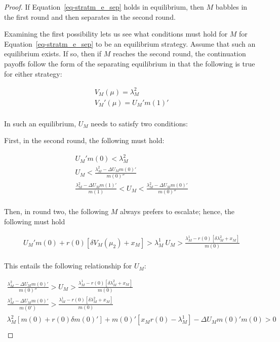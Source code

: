 \documentclass[
  12pt,
]{article}
\theoremstyle{plain}
\theoremstyle{plain}
\theoremstyle{remark}
\begin{document}
\begin{proof}
If Equation~\ref{eq-stratm_e_sep} holds in equilibrium, then \(M\)
babbles in the first round and then separates in the second round.

Examining the first possibility lets us see what conditions must hold
for \(M\) for Equation~\ref{eq-stratm_e_sep} to be an equilibrium
strategy. Assume that such an equilibrium exists. If so, then if \(M\)
reaches the second round, the continuation payoffs follow the form of
the separating equilibrium in that the following is true for either
strategy:

\[
\begin{aligned}
V_M(\mu)  = \lambda^2_M\\
V_M'(\mu)  = U_M' m(1)'\\
\end{aligned}
\]

In such an equilibrium, \(U_M\) needs to satisfy two conditions:

First, in the second round, the following must hold:

\[
\begin{aligned}
U_M' m(0) < \lambda^2_M\\
U_M < \frac{\lambda^2_M - \Delta U_M m(0)'}{m(0)''}\\
\frac{\lambda^2_M - \Delta U_M m(1)'}{m(1)}< U_M < \frac{\lambda^2_M - \Delta U_M m(0)'}{m(0)''}\\
\end{aligned}
\]

Then, in round two, the following \(M\) always prefers to escalate;
hence, the following must hold

\[
\begin{aligned}
U_M' m(0) + r(0)[\delta V_M(\mu_2) + x_M] > \lambda^1_M\
U_M > \frac{\lambda^1_M- r(0)[\delta \lambda^2_M + x_M]}{m(0)}\\
\end{aligned}
\]

This entails the following relationship for \(U_M\):

\[
\begin{aligned}
\frac{\lambda^2_M - \Delta U_M m(0)'}{m(0)''} > U_M > \frac{\lambda^1_M- r(0)[\delta \lambda^2_M + x_M]}{m(0)}\\
\frac{\lambda^2_M- \Delta U_M m(0)'}{m(0')} > \frac{\lambda^1_M - r(0)[\delta \lambda^2_M + x_M]}{m(0)}\\
\lambda^2_M [m(0) + r(0)\delta m(0)'] + m(0)'[x_M r(0) - \lambda^1_M] - \Delta U_M m(0)'m(0) >0\\
\end{aligned}
\]


\end{proof}
\end{document}
